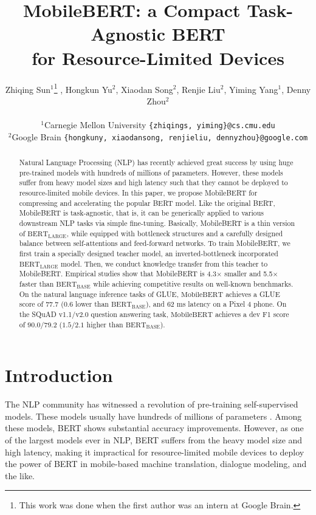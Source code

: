 \documentclass[11pt,a4paper]{article}
\title{MobileBERT: a Compact Task-Agnostic BERT \\ for Resource-Limited Devices}
\author{
Zhiqing Sun$^1$\thanks{This work was done when the first author was an intern at Google Brain.} ,
Hongkun Yu$^2$,
Xiaodan Song$^2$,
Renjie Liu$^2$,
Yiming Yang$^1$,
Denny Zhou$^2$\\
\\
$^1$Carnegie Mellon University \texttt{\{zhiqings, yiming\}@cs.cmu.edu}\\
$^2$Google Brain \texttt{\{hongkuny, xiaodansong, renjieliu, dennyzhou\}@google.com}\\
}
\date{}
\begin{document}
\maketitle
\begin{abstract}
	Natural Language Processing (NLP) has recently achieved great success by using huge pre-trained models with hundreds of millions of parameters. However, these models suffer from  heavy model sizes and high latency such that they cannot be deployed to resource-limited mobile devices. In this paper, we propose MobileBERT for compressing and accelerating the popular BERT model. Like the original BERT, MobileBERT is task-agnostic, that is, it can be generically applied to various downstream NLP tasks via simple fine-tuning. Basically, MobileBERT is a thin version of $\text{BERT}_\text{LARGE}$, while equipped with bottleneck structures and a carefully designed balance between self-attentions and feed-forward networks. To train MobileBERT, we first train a specially designed teacher model, an inverted-bottleneck incorporated $\text{BERT}_\text{LARGE}$ model. Then, we conduct knowledge transfer from this  teacher to MobileBERT. Empirical studies show that MobileBERT is 4.3$\times$ smaller and 5.5$\times$ faster than  $\text{BERT}_\text{BASE}$ while achieving competitive results on well-known benchmarks.
	On the natural language inference tasks of GLUE, $\text{MobileBERT}$ achieves a GLUE score of $77.7$  ($0.6$ lower than $\text{BERT}_\text{BASE}$), 
	and 62 ms latency on a Pixel 4 phone. On the SQuAD v1.1/v2.0 question answering task, $\text{MobileBERT}$ achieves a dev F1 score of $90.0/79.2$  ($1.5/2.1$ higher than $\text{BERT}_\text{BASE}$). 
	
\end{abstract}

\section{Introduction}

The NLP community has witnessed a revolution of pre-training self-supervised models. These models usually have hundreds of millions of parameters \citep{peters2018deep,radford2018improving,devlin2018bert, radford2019language,yang2019xlnet}.
Among these models, BERT \citep{devlin2018bert} shows substantial accuracy improvements.
However, as one of the largest models ever in NLP, BERT suffers from the heavy model size and high latency, making it impractical for resource-limited mobile devices to deploy the power of BERT in mobile-based machine translation, dialogue modeling, and the like.
\end{document}
